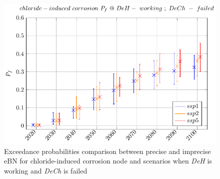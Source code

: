 \begin{figure}[H]
    \centering
    \includegraphics[width=0.8\linewidth]{imgs/pdfs/21_Chloride_comparizon_workingbroken.pdf}
    \caption{Exceedance probabilities comparison between precise and imprecise eBN for chloride-induced corrosion node and scenarios when \textit{DeH} is working and \textit{DeCh} is failed}\label{comparizon_ch_brokenworking}
\end{figure}
